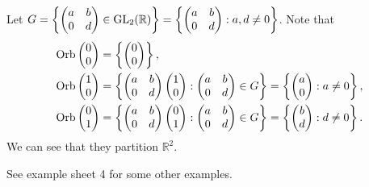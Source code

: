 \documentclass[a4paper]{article}
\begin{document}
    \begin{example}
        Let $ G = \left\{ \begin{pmatrix} a&b\\0&d \end{pmatrix}\in \mathrm{GL}_2(\mathbb{R}) \right\}=\left\{ \begin{pmatrix} a&b\\0&d \end{pmatrix}:a,d\neq 0 \right\} $. Note that 
        \begin{align*}
            \operatorname{Orb}\begin{pmatrix}
                0\\0
            \end{pmatrix}&=\left\{ \begin{pmatrix}
                0\\0
            \end{pmatrix} \right\},\\
            \operatorname{Orb} \begin{pmatrix}
                1\\0
            \end{pmatrix}&=\left\{ \begin{pmatrix} a&b\\0&d \end{pmatrix}\begin{pmatrix}
                1\\0
            \end{pmatrix}:\begin{pmatrix} a&b\\0&d \end{pmatrix}\in G \right\} = \left\{ \begin{pmatrix}
                a\\0
            \end{pmatrix}:a\neq 0 \right\},\\
            \operatorname{Orb}\begin{pmatrix}
                0\\1
            \end{pmatrix}&=\left\{ \begin{pmatrix} a&b\\0&d \end{pmatrix}\begin{pmatrix}
                0\\1
            \end{pmatrix}:\begin{pmatrix} a&b\\0&d \end{pmatrix}\in G \right\} = \left\{ \begin{pmatrix}
                b\\d
            \end{pmatrix}:d\neq 0 \right\}.
        \end{align*}
        We can see that they partition $ \mathbb{R}^{2} $.
    \end{example}
    See example sheet 4 for some other examples.
\end{document}

